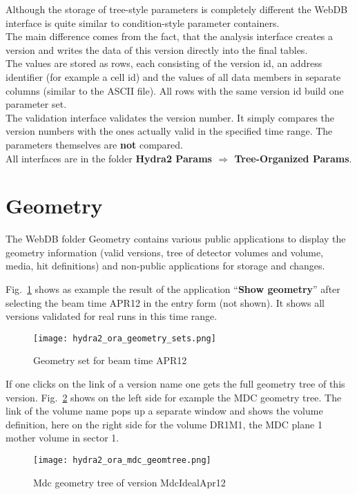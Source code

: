 Although the storage of tree-style parameters is completely different the WebDB interface is quite similar to condition-style 
parameter containers.\\
The main difference comes from the fact, that the analysis interface creates a version and writes the data of this version 
directly into the final tables.\\
The values are stored as rows, each consisting of the version id, an address identifier (for example a cell id) and the 
values of all data members in separate columns (similar to the ASCII file). All rows with the same version id 
build one parameter set.\\
The validation interface validates the version number. It simply compares the version numbers with the ones actually valid in 
the specified time range. The parameters themselves are \textbf{not} compared.\\
 
All interfaces are in the folder \textbf{Hydra2 Params $\Rightarrow$ Tree-Organized Params}.
\clearpage

\section[Geometry]{Geometry} \label{sec:oraGeometry}

The WebDB folder Geometry contains various public applications to display the geometry information (valid versions, tree of detector 
volumes and volume, media, hit definitions) and non-public applications for storage and changes.
 
Fig.~\ref{fig:oraGeometrySets} shows as example the result of the application ``\textbf{Show geometry}'' after selecting 
the beam time APR12 in the entry form (not shown). It shows all versions validated for real runs in this time range.
\begin{figure}[\htb]
  \centering
  \texttt{[image: hydra2\_ora\_geometry\_sets.png]}
  \caption[Geometry set for beam time APR12]
          {Geometry set for beam time APR12}
  \label{fig:oraGeometrySets}
\end{figure}

If one clicks on the link of a version name one gets the full geometry tree of this version. Fig.~\ref{fig:oraMdcGeomTree} 
shows on the left side for example the MDC geometry tree. The link of the volume name pops up a separate window and shows 
the volume definition, here on the right side for the volume DR1M1, the MDC plane 1 mother volume in sector 1.
\begin{figure}[\htb]
  \centering
  \texttt{[image: hydra2\_ora\_mdc\_geomtree.png]}
  \caption[MDC geometry tree of version MdcIdealApr12]
          {Mdc geometry tree of version MdcIdealApr12}
  \label{fig:oraMdcGeomTree}
\end{figure}

